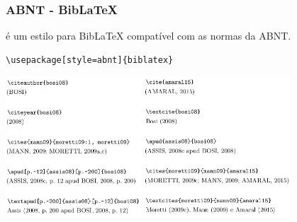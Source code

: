 \begin{frame}
\frametitle{ABNT - BibLaTeX}
 é um estilo para BibLaTeX compatível com as normas da ABNT.

\vspace{5ex}
\begin{verbatim}
\usepackage[style=abnt]{biblatex}

\end{verbatim}

\framebreak

\includegraphics[width=0.8\textwidth,height=0.7\textheight,keepaspectratio]{figures/abnt-example.png}
\end{frame}


